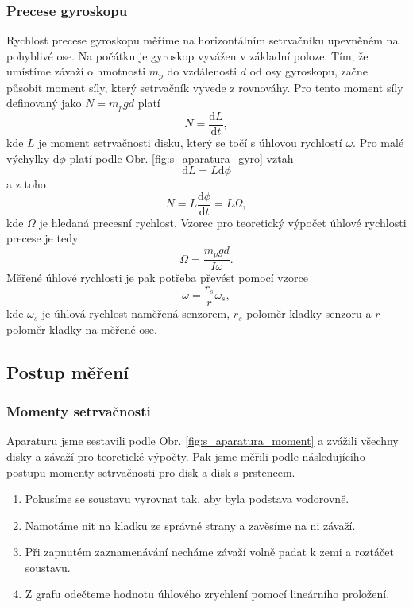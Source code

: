 \documentclass[english]{article}
\begin{document}
\subsubsection{Precese gyroskopu}
Rychlost precese gyroskopu měříme na horizontálním setrvačníku upevněném na pohyblivé ose. Na počátku je gyroskop vyvážen v základní poloze. Tím, že umístíme závaží o hmotnosti $m_p$ do vzdálenosti $d$ od osy gyroskopu, začne působit moment síly, který setrvačník vyvede z rovnováhy. Pro tento moment síly definovaný jako $N=m_pgd$ platí 
\begin{equation}
N = \frac{\mathrm{d}L}{\mathrm{d}t},
\end{equation}
kde $L$ je moment setrvačnosti disku, který se točí s úhlovou rychlostí $\omega$. Pro malé výchylky $\mathrm{d} \phi$ platí podle Obr. \ref{fig:s_aparatura_gyro} vztah
\begin{equation}
\mathrm{d}L = L \mathrm{d}\phi
\end{equation}
a z toho
\begin{equation}
N = L \frac{\mathrm{d}\phi}{\mathrm{d}t} = L \Omega,
\end{equation}
kde $\Omega$ je hledaná precesní rychlost. Vzorec pro teoretický výpočet úhlové rychlosti precese je tedy
\begin{equation} \label{eq:precese_final}
\Omega = \frac{m_p g d}{I \omega}.
\end{equation}
Měřené úhlové rychlosti je pak potřeba převést pomocí vzorce
 \begin{equation}
 \omega = \frac{r_s}{r} \omega_s,
 \label{eq:prevody}
 \end{equation}
 kde $\omega_s$ je úhlová rychlost naměřená senzorem, $r_s$ poloměr kladky senzoru a $r$ poloměr kladky na měřené ose.
		
\subsection{Postup měření}
	\subsubsection{Momenty setrvačnosti}
	Aparaturu jsme sestavili podle Obr. \ref{fig:s_aparatura_moment} a zvážili všechny disky a závaží pro teoretické výpočty. Pak jsme měřili podle následujícího postupu momenty setrvačnosti pro disk a disk s prstencem.
	\begin{enumerate}
		\item Pokusíme se soustavu vyrovnat tak, aby byla podstava vodorovně.
		\item Namotáme nit na kladku ze správné strany a zavěsíme na ni závaží.
		\item Při zapnutém zaznamenávání necháme závaží volně padat k zemi a roztáčet soustavu.
		\item Z grafu odečteme hodnotu úhlového zrychlení pomocí lineárního proložení.
	\end{enumerate}
	
\end{document}
